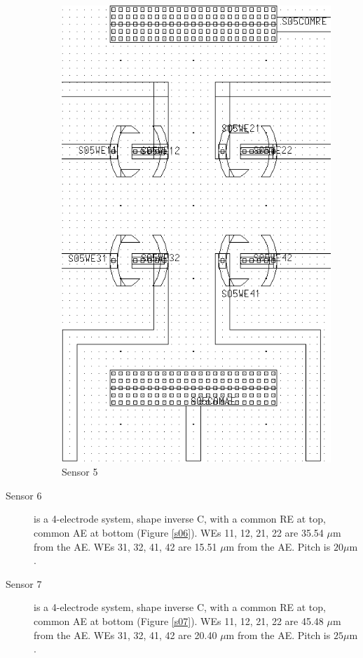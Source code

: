 \begin{description}
\begin{figure}
\begin{minipage}{0.5\linewidth}
		\includegraphics[width=0.6\linewidth]{figures/s05.png}
		\caption{Sensor 5}
		\label{s05}
	\end{minipage}
\end{figure}

\item[Sensor 6] is a 4-electrode system, shape inverse C, with a common RE at top, common AE at bottom (Figure \ref{s06}). WEs 11, 12, 21, 22 are 35.54 $\mu \mathrm{m}$ from the AE. WEs 31, 32, 41, 42 are 15.51 $\mu \mathrm{m}$ from the AE. Pitch is $20 \mu \mathrm{m}$.
\item[Sensor 7] is a 4-electrode system, shape inverse C, with a common RE at top, common AE at bottom (Figure \ref{s07}). WEs 11, 12, 21, 22 are 45.48 $\mu \mathrm{m}$ from the AE. WEs 31, 32, 41, 42 are 20.40 $\mu \mathrm{m}$ from the AE. Pitch is $25 \mu \mathrm{m}$.


\end{description}
